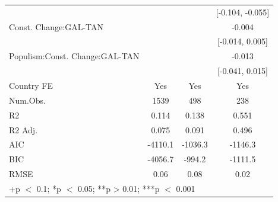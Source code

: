 \documentclass[
  abstract]{article}
\begin{document}
\begin{table}
\begin{tabular}[t]{lccc}
 &  &  & {}[-0.104, -0.055]\\
Const. Change:GAL-TAN &  &  & -0.004\\
 &  &  & {}[-0.014, 0.005]\\
Populism:Const. Change:GAL-TAN &  &  & -0.013\\
 &  &  & {}[-0.041, 0.015]\\
\midrule
Country FE & Yes & Yes & Yes\\
Num.Obs. & 1539 & 498 & 238\\
R2 & 0.114 & 0.138 & 0.551\\
R2 Adj. & 0.075 & 0.091 & 0.496\\
AIC & -4110.1 & -1036.3 & -1146.3\\
BIC & -4056.7 & -994.2 & -1111.5\\
RMSE & 0.06 & 0.08 & 0.02\\
\bottomrule
\multicolumn{4}{l}{\rule{0pt}{1em}+p $<$ 0.1; *p $<$ 0.05; **p > 0.01; ***p $<$ 0.001}\\
\end{tabular}
\end{table}
\end{document}
